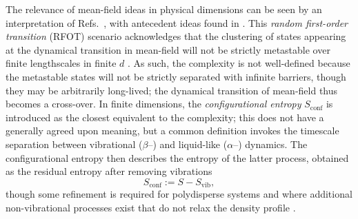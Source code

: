 \documentclass[11pt,twoside]{report}
\begin{document}
The relevance of mean-field ideas in physical dimensions can be seen by an interpretation of Refs.\ \cite{KirkpatrickPRB1987,HallJCP1987,KirkpatrickPRA1989}, with antecedent ideas found in \cite{KauzmannCR1948,AdamJCP1965}.
This \emph{random first-order transition} (RFOT) scenario acknowledges that the clustering of states appearing at the dynamical transition in mean-field will not be strictly metastable over finite lengthscales in finite $d$ \cite{BouchaudJCP2004,MontanariJSP2006}.
As such, the complexity is not well-defined because the metastable states will not be strictly separated with infinite barriers, though they may be arbitrarily long-lived; the dynamical transition of mean-field thus becomes a cross-over.
In finite dimensions, the \emph{configurational entropy} $S_\mathrm{conf}$ is introduced as the closest equivalent to the complexity; this does not have a generally agreed upon meaning, but a common definition invokes the timescale separation between vibrational ($\beta$--) and liquid-like ($\alpha$--) dynamics.
The configurational entropy then describes the entropy of the latter process, obtained as the residual entropy after removing vibrations
\begin{equation}\label{eq:sconf}
  S_\mathrm{conf} := S - S_\mathrm{vib},
\end{equation}
though some refinement is required for polydisperse systems \cite{OzawaJCP2017,OzawaJCP2018} and where additional non-vibrational processes exist that do not relax the density profile \cite{OzawaPRL2018}.
\end{document}
